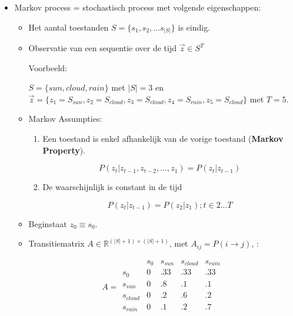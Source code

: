 \begin{itemize}
	\item Markov process = stochastisch process met volgende eigenschappen:
	\begin{itemize}
		\item Het aantal toestanden $S = \{s_1, s_2, ... s_{|S|}\}$ is eindig.
		\item Observatie van een sequentie over de tijd $\vec{z} \in S^T$
		
		Voorbeeld: 
		
		$S = \{sun, cloud, rain\}$ met $|S| = 3$ en $\vec{z} = \{z_1=S_{sun},z_2=S_{cloud},z_3=S_{cloud},z_4=S_{rain},z_5=S_{cloud}\}$ met $T = 5$.
		\item Markov Assumpties:
		\begin{enumerate}
			\item Een toestand is enkel afhankelijk van de vorige toestand (\textbf{Markov Property}).
			
			$$P(z_t | z_{t - 1},z_{t-2}, ..., z_1) = P(z_t|z_{t-1})$$
			\item De waarschijnlijk is constant in de tijd
			
			$$P(z_t|z_{t - 1}) = P(z_2|z_1); t \in 2 ...T$$
		\end{enumerate}
		\item Beginstaat $z_0 \equiv s_0$.
		\item Transitiematrix $A \in \mathbb{R}^{(|S| + 1)\times(|S| + 1)}$, met $A_{ij} = P(i \rightarrow j)$, :
		
		$$A = \begin{matrix}
		     & s_0 & s_{sun} & s_{cloud} & s_{rain} \\
		 s_0 & 0 & .33 & .33 & .33 \\
		 s_{sun} & 0 & .8 & .1 & .1 \\
		 s_{cloud} & 0 & .2 & .6 & .2 \\
		 s_{rain} & 0 & .1 & .2 & .7 \\
		\end{matrix}$$
	\end{itemize}

\end{itemize}

